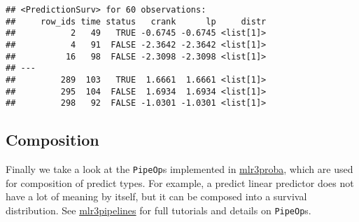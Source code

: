 \documentclass[
]{scrbook}
\newenvironment{Shaded}{\begin{snugshade}}{\end{snugshade}}
\newcommand{\AttributeTok}[1]{\textcolor[rgb]{0.77,0.63,0.00}{#1}}
\newcommand{\FloatTok}[1]{\textcolor[rgb]{0.00,0.00,0.81}{#1}}
\newcommand{\FunctionTok}[1]{\textcolor[rgb]{0.00,0.00,0.00}{#1}}
\newcommand{\NormalTok}[1]{#1}
\newcommand{\OtherTok}[1]{\textcolor[rgb]{0.56,0.35,0.01}{#1}}
\newcommand{\SpecialCharTok}[1]{\textcolor[rgb]{0.00,0.00,0.00}{#1}}
\newcommand{\StringTok}[1]{\textcolor[rgb]{0.31,0.60,0.02}{#1}}
\renewenvironment{Shaded} {\begin{snugshade}\small} {\end{snugshade}}
\begin{document}
\begin{Shaded}
\end{Shaded}

\begin{verbatim}
## <PredictionSurv> for 60 observations:
##     row_ids time status   crank      lp     distr
##           2   49   TRUE -0.6745 -0.6745 <list[1]>
##           4   91  FALSE -2.3642 -2.3642 <list[1]>
##          16   98  FALSE -2.3098 -2.3098 <list[1]>
## ---                                              
##         289  103   TRUE  1.6661  1.6661 <list[1]>
##         295  104  FALSE  1.6934  1.6934 <list[1]>
##         298   92  FALSE -1.0301 -1.0301 <list[1]>
\end{verbatim}

\hypertarget{composition}{%
\subsection{Composition}\label{composition}}

Finally we take a look at the \texttt{PipeOp}s implemented in \href{https://mlr3proba.mlr-org.com}{mlr3proba}, which are used for composition of predict types.
For example, a predict linear predictor does not have a lot of meaning by itself, but it can be composed into a survival distribution.
See \href{https://mlr3pipelines.mlr-org.com}{mlr3pipelines} for full tutorials and details on \texttt{PipeOp}s.
\end{document}
